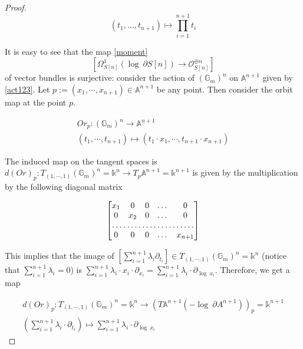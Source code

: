 \documentclass[10pt,a4paper]{amsart}
\begin{document}
\begin{proof}
\begin{equation}\label{act}
(t_1, \dots, t_{n+1})\mapsto \prod^{n+1}_{i=1} t_i
\end{equation}

It is easy to see that the map \eqref{moment} 
\begin{equation}
\left[\Omega_{S[n]}^{1}(\log ~\partial S[n])\longrightarrow \mathcal O_{S[n]}^{\oplus n}\right]
\end{equation} 
of vector bundles is surjective: consider the action of $(\mathbb G_m)^n$ on $\mathbb A^{n+1}$ given by \eqref{act123}. Let $p:=(x_1, \cdots, x_{n+1})\in \mathbb A^{n+1}$ be any point. Then consider the orbit map at the point $p$. 

\begin{align}
    Or_p: (\mathbb G_m)^n\longrightarrow \mathbb A^{n+1}\\
    (t_1, \cdots, t_{n+1})\mapsto (t_1\cdot x_1, \cdots, t_{n+1}\cdot x_{n+1})
\end{align}

The induced map on the tangent spaces is $d(Or)_p: T_{(1,\cdots, 1)}(\mathbb G_m)^n=\mathbb k^n\longrightarrow T_p \mathbb A^{n+1}=\mathbb k^{n+1}$ is given by the multiplication by the following diagonal matrix

\smallskip

\[
\begin{bmatrix}
    x_1       & 0 & 0 & \dots & 0 \\
    0       & x_2 & 0 & \dots & 0 \\
    \hdotsfor{5} \\
    0       & 0 & 0 & \dots & x_{n+1}
\end{bmatrix}
\]

\smallskip

This implies that the image of $[\sum^{n+1}_{i=1} \lambda_i \partial_{t_i}]\in T_{(1,\cdots, 1)}(\mathbb G_m)^n=\mathbb k^n$ (notice that $\sum^{n+1}_{i=1} \lambda_i=0$) is $\sum^{n+1}_{i=1} \lambda_i\cdot x_i \cdot \partial_{x_i}=\sum^{n+1}_{i=1} \lambda_i\cdot \partial_{\log~x_i}$. Therefore, we get a map 

\begin{align}
    d(Or)_p: T_{(1,\cdots, 1)}(\mathbb G_m)^n=\mathbb k^n\longrightarrow (T \mathbb A^{n+1}(-\log~\partial A^{n+1}))_p=\mathbb k^{n+1}\\
    (\sum^{n+1}_{i=1} \lambda_i\cdot \partial_{t_i})\mapsto \sum^{n+1}_{i=1} \lambda_i\cdot \partial_{\log~x_i}
\end{align}


\end{proof}
\end{document}
